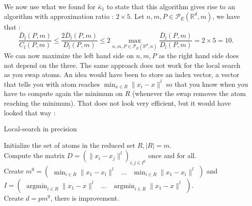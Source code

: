 \documentclass{amsart}
\newcommand{\argmin}{\mathop{\arg\min}}
\newcommand{\RR}{\mathbb{R}}
\begin{document}
We now use what we found for $\bar\kappa_1$ to state that this algorithm gives rise to an algorithm with approximation ratio : $2\times 5$. Let $n,m,P\in\mathcal{P}_E\left(\RR^d,m\right)$, we have that : 
$$
\frac{\bar{D}_l\left(P,m\right)}{C_l\left(P,m\right)}\leq \frac{2\bar{D}_l\left(P,m\right)}{D_l\left(P,m\right)}\leq 2\max_{n,m,P\in\mathcal{P}_E(\RR^d,n)}\frac{\bar{D}_l\left(P,m\right)}{D_l\left(P,m\right)}=2\times5=10.
$$
We can now maximize the left hand side on $n,m,P$ as the right hand side does not depend on the three.
The same approach does not work for the local search as you swap atoms. An idea would have been to store an index vector, a vector that tells you with atom reaches $\min_{x\in R}\lVert x_i-x\rVert^l$ so that you know when you have to compute again the minimum on $R$ (whenever the swap removes the atom reaching the minimum). That does not look very efficient, but it would have looked that way : 
\begin{algorithm}
\caption{Local-search in precision}
Initialize the set of atoms in the reduced set $R, \lvert R\rvert=m$.\\
Compute the matrix $D = \left(\| x_i - x_j \|^l \right)_{i,j \in I^2}$ once and for all.\\
Create $m^0 = \begin{pmatrix}\min_{i\in R}\lVert x_1-x_i\rVert^l & \hdots & \min_{i\in R}\lVert x_1-x_i\rVert^l \end{pmatrix}$ and $I=\begin{pmatrix}\argmin_{i\in R}\lVert x_1-x\rVert^l & \hdots & \argmin_{i\in R}\lVert x_1-x\rVert^l \end{pmatrix}$.\\
Create $d=pm^0$, there is improvement. \\
\end{algorithm}
\end{document}
